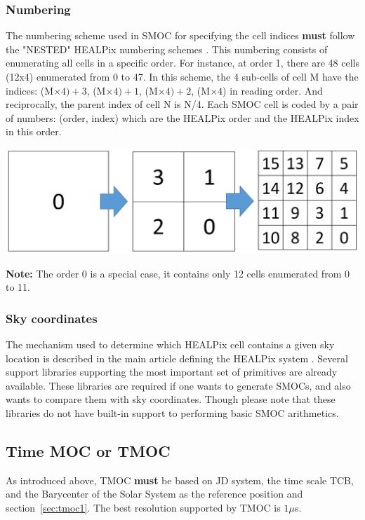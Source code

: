 \documentclass[11pt,a4paper]{ivoa}
\begin{document}
\subsubsection{Numbering}

The numbering scheme used in SMOC for specifying the cell indices {\bf
  must} follow the "NESTED" HEALPix numbering schemes
\citep{2005ApJ...622..759G}. This numbering consists of enumerating all cells in a
specific order. For instance, at order 1, there are 48 cells (12x4)
enumerated from 0 to 47. In this scheme, the 4 sub-cells of cell M
have the indices: (M$\times4)+3$, (M$\times4)+1$, (M$\times4)+2$,
(M$\times4$) in reading
order. And reciprocally, the parent index of cell N is
N/4. Each SMOC cell is coded by a pair of numbers:
(order, index) which are the HEALPix order and the HEALPix index in this
order.

\begin{adjustbox}{center,caption={HEALPix numbering principle},
    label={Fig:HEALPix numbering},nofloat=figure,vspace=\bigskipamount}
\includegraphics[width=\textwidth]{nested_healpix.jpg}
\end{adjustbox}

{\bf Note:} The order 0 is a special case, it contains only 12
cells enumerated from 0 to 11.


\subsubsection{Sky coordinates}
The mechanism used to determine which HEALPix cell contains a given
sky location is described in the main article defining the HEALPix
system \citep{2005ApJ...622..759G}. Several support libraries
supporting the most important set of primitives are already available.
These libraries are required if one wants to generate SMOCs, and also
wants to compare them with sky coordinates. Though please
note that these libraries do not have built-in support to performing
basic SMOC arithmetics.

\subsection{Time MOC or TMOC}
As introduced above, TMOC {\bf must} be based on JD system, the time
scale TCB, and the Barycenter of the Solar System as the reference
position \citep[see also][]{2019ASPC..523..497F} and section~\ref{sec:tmoc1}.
The best resolution supported by TMOC is $1 \mu$s.
\end{document}
